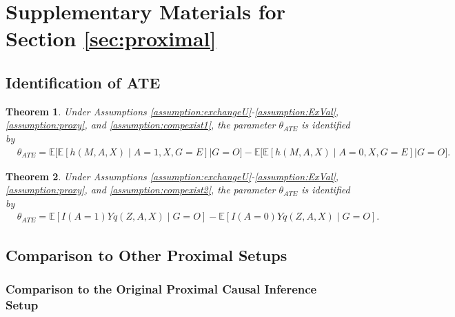 \documentclass[10pt]{article}
\newtheorem{theorem}{Theorem}
\newcommand{\E}{\mathbb{E}}
\begin{document}
	





\section{Supplementary Materials for Section \ref{sec:proximal}}
\label{sec:proximal::supp}


\subsection{Identification of ATE}


\begin{theorem}
\label{thm:POR::supp}
Under Assumptions \ref{assumption:exchangeU}-\ref{assumption:ExVal}, \ref{assumption:proxy}, and \ref{assumption:compexist1}, the parameter $\theta_{ATE}$ is identified by
\begin{equation*}
\begin{aligned}
&\theta_{ATE}=
\E\big[\E[h(M,A,X)\mid A=1,X,G=E]\big|  G=O\big]
-\E\big[\E[h(M,A,X)\mid A=0,X,G=E]\big|  G=O\big].
\end{aligned}
\end{equation*}
\end{theorem}



\begin{theorem}
\label{thm:PIPW::supp}
Under Assumptions \ref{assumption:exchangeU}-\ref{assumption:ExVal}, \ref{assumption:proxy}, and \ref{assumption:compexist2}, the parameter $\theta_{ATE}$ is 
identified by
\begin{equation*}
\begin{aligned}
&\theta_{ATE}=
\E[I(A=1)Yq(Z,A,X)\mid G=O]-\E[I(A=0)Yq(Z,A,X)\mid G=O].
\end{aligned}
\end{equation*}
\end{theorem}




\subsection{Comparison to Other Proximal Setups}

\subsubsection{Comparison to the Original Proximal Causal Inference Setup}
\label{sec:prox:orig}
\end{document}

